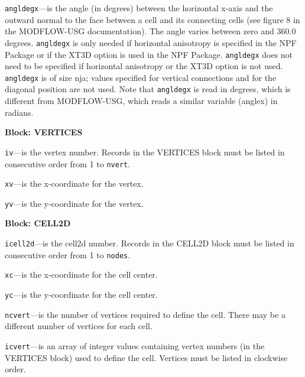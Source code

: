 \begin{description}
\item \texttt{angldegx}---is the angle (in degrees) between the horizontal x-axis and the outward normal to the face between a cell and its connecting cells (see figure 8 in the MODFLOW-USG documentation). The angle varies between zero and 360.0 degrees.  \texttt{angldegx} is only needed if horizontal anisotropy is specified in the NPF Package or if the XT3D option is used in the NPF Package.  \texttt{angldegx} does not need to be specified if horizontal anisotropy or the XT3D option is not used.  \texttt{angldegx} is of size nja; values specified for vertical connections and for the diagonal position are not used.  Note that \texttt{angldegx} is read in degrees, which is different from MODFLOW-USG, which reads a similar variable (anglex) in radians.

\end{description}
\item \textbf{Block: VERTICES}

\begin{description}
\item \texttt{iv}---is the vertex number.  Records in the VERTICES block must be listed in consecutive order from 1 to \texttt{nvert}.

\item \texttt{xv}---is the x-coordinate for the vertex.

\item \texttt{yv}---is the y-coordinate for the vertex.

\end{description}
\item \textbf{Block: CELL2D}

\begin{description}
\item \texttt{icell2d}---is the cell2d number.  Records in the CELL2D block must be listed in consecutive order from 1 to \texttt{nodes}.

\item \texttt{xc}---is the x-coordinate for the cell center.

\item \texttt{yc}---is the y-coordinate for the cell center.

\item \texttt{ncvert}---is the number of vertices required to define the cell.  There may be a different number of vertices for each cell.

\item \texttt{icvert}---is an array of integer values containing vertex numbers (in the VERTICES block) used to define the cell.  Vertices must be listed in clockwise order.

\end{description}

